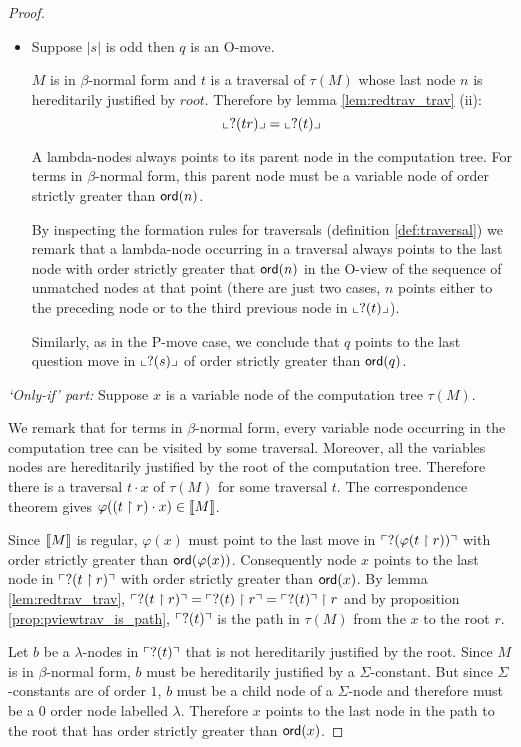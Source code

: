 \begin{proof}
\begin{itemize}
\item Suppose $|s|$ is odd then $q$ is an O-move.

$M$ is in $\beta$-normal form and $t$ is a traversal of $\tau(M)$
whose last node $n$ is hereditarily justified by $root$. Therefore  by lemma \ref{lem:redtrav_trav} (ii):
\begin{equation}
 \llcorner ?(tr) \lrcorner = \llcorner ?(t) \lrcorner \label{eq:oview_r}
\end{equation}


A lambda-nodes always points to its parent node in the computation
tree. For terms in $\beta$-normal form, this parent node must be a
variable node of order strictly greater than ${\sf ord}(n)$.

By inspecting the formation rules for traversals (definition
\ref{def:traversal}) we remark that a lambda-node occurring in a
traversal always points to the last node with order strictly greater
that ${\sf ord}(n)$ in the O-view of the sequence of unmatched nodes at
that point (there are just two cases, $n$ points either to the
preceding node or to the third previous node in $\llcorner ?(t) \lrcorner$).

Similarly, as in the P-move case, we conclude that $q$ points to the
last question move in $\llcorner ?(s) \lrcorner$ of order strictly greater than
${\sf ord}(q)$.
\end{itemize}

\noindent  \emph{`Only-if' part:}
Suppose $x$ is a variable node of the computation tree $\tau(M)$.

We remark that for terms in $\beta$-normal form, every variable node occurring in the computation tree can be visited by some traversal.
Moreover, all the variables nodes are hereditarily justified by the root of the computation tree.
Therefore there is a traversal $t \cdot x$ of $\tau(M)$ for some traversal $t$.
The correspondence theorem gives $\varphi((t \upharpoonright r) \cdot x) \in {[\![M ]\!]}$.

Since ${[\![ M ]\!]}$ is regular, $\varphi(x)$ must point to the last move in $\ulcorner ?(\varphi(t \upharpoonright r)) \urcorner$ with
order strictly greater than ${\sf ord}(\varphi(x))$.
Consequently node $x$ points to the last node in $\ulcorner ?(t \upharpoonright r) \urcorner$ with
order strictly greater than ${\sf ord}(x)$.
By lemma \ref{lem:redtrav_trav}, $\ulcorner ?(t \upharpoonright r) \urcorner = \ulcorner ?(t) \upharpoonright r \urcorner = \ulcorner ?(t) \urcorner \upharpoonright r$
and by proposition \ref{prop:pviewtrav_is_path}, $\ulcorner ?(t) \urcorner$ is
the path in $\tau(M)$ from the $x$ to the root $r$.

Let $b$ be a $\lambda$-nodes in $\ulcorner ?(t) \urcorner$ that is not hereditarily justified by the root.
Since $M$ is in $\beta$-normal form, $b$ must be hereditarily justified by a $\Sigma$-constant.
But since $\Sigma$-constants are of order $1$, $b$ must be a child node of a $\Sigma$-node and therefore must be a $0$ order node labelled $\lambda$.
Therefore $x$ points to the last node in the path to the root that has order strictly greater than ${\sf ord}(x)$.
\end{proof}



